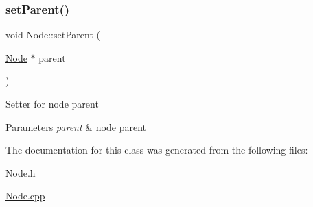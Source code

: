 \subsubsection{\texorpdfstring{set\+Parent()}{setParent()}}
{\footnotesize\ttfamily void Node\+::set\+Parent (\begin{DoxyParamCaption}\item[{\hyperlink{classNode}{Node} $\ast$}]{parent }\end{DoxyParamCaption})}

Setter for node parent 
\begin{DoxyParams}{Parameters}
{\em parent} & node parent \\
\hline
\end{DoxyParams}


The documentation for this class was generated from the following files\+:\begin{DoxyCompactItemize}
\item 
\hyperlink{Node_8h}{Node.\+h}\item 
\hyperlink{Node_8cpp}{Node.\+cpp}\end{DoxyCompactItemize}
